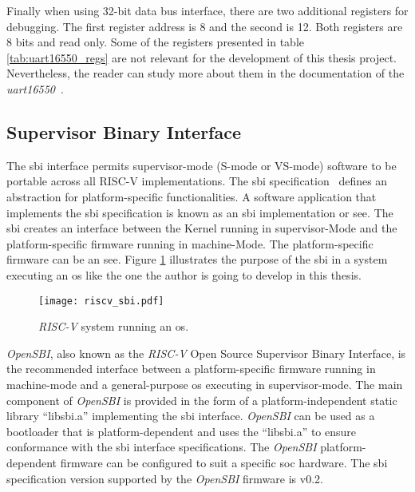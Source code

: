 Finally when using 32-bit data bus interface, there are two additional registers for debugging. The first register address is 8 and the second is 12. Both registers are 8 bits and read only. Some of the registers presented in table \ref{tab:uart16550_regs} are not relevant for the development of this thesis project. Nevertheless, the reader can study more about them in the documentation of the \textit{\acrshort{uart}16550}~\cite{gorban2002uart}.

\subsection{Supervisor Binary Interface}
\label{subsection:sbi}
The \acrfull{sbi} interface permits supervisor-mode (S-mode or VS-mode) software to be portable across all RISC-V implementations. The \acrfull{sbi} specification~\cite{sbi_riscv_spec} defines an abstraction for platform-specific functionalities. A software application that implements the \acrfull{sbi} specification is known as an \acrshort{sbi} implementation or \acrfull{see}. The \acrshort{sbi} creates an interface between the Kernel running in \acrshort{supervisor}-Mode and the platform-specific firmware running in \acrshort{machine}-Mode. The platform-specific firmware can be an \acrlong{see}. Figure \ref{fig:riscv_sbi} illustrates the purpose of the \acrshort{sbi} in a system executing an \acrshort{os} like the one the author is going to develop in this thesis.

\begin{figure}[!h]
    \centering
    \texttt{[image: riscv\_sbi.pdf]}
    \caption{\textit{RISC-V} system running an \acrlong{os}.}
    \label{fig:riscv_sbi}
\end{figure}

\textit{OpenSBI}, also known as the \textit{RISC-V} Open Source Supervisor Binary Interface, is the recommended interface between a platform-specific firmware running in \acrshort{machine}-mode and a general-purpose \acrshort{os} executing in \acrshort{supervisor}-mode. The main component of \textit{OpenSBI} is provided in the form of a platform-independent static library \enquote{libsbi.a} implementing the \acrshort{sbi} interface. \textit{OpenSBI} can be used as a bootloader that is platform-dependent and uses the \enquote{libsbi.a} to ensure conformance with the \acrshort{sbi} interface specifications. The \textit{OpenSBI} platform-dependent firmware can be configured to suit a specific \acrlong{soc} hardware. The \acrshort{sbi} specification version supported by the \textit{OpenSBI} firmware is v0.2.

